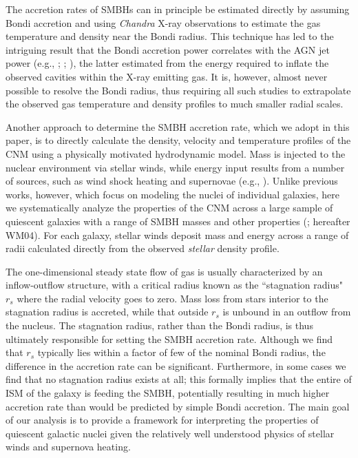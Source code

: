\documentclass[usenatbib,fleqn]{mn2e}
\newcommand{\rs}{r_s}
\begin{document}
The accretion rates of SMBHs can in principle be estimated directly by assuming Bondi accretion and using {\it Chandra} X-ray observations to estimate the gas temperature and density near the Bondi radius.  This technique has led to the intriguing result that the Bondi accretion power correlates with the AGN jet power (e.g., \citealt{AllenDunn+:2006a}; \citealt{Russell+13}; \citealt{FujitaKawakatu+:2014a}), the latter estimated from the energy required to inflate the observed cavities within the X-ray emitting gas.  It is, however, almost never possible to resolve the Bondi radius, thus requiring all such studies to extrapolate the observed gas temperature and density profiles to much smaller radial scales.  

Another approach to determine the SMBH accretion rate, which we adopt in this paper, is to directly calculate the density, velocity and temperature profiles of the CNM using a physically motivated hydrodynamic model.  Mass is injected to the nuclear environment via stellar winds, while energy input results from a number of sources, such as wind shock heating and supernovae (e.g., \citealt{Quataert:2004a,De-ColleGuillochon+:2012a,ShcherbakovWong+:2014a}).  Unlike previous works, however, which focus on modeling the nuclei of individual galaxies, here we systematically analyze the properties of the CNM across a large sample of quiescent galaxies with a range of SMBH masses and other properties (\citealt{WangMerritt:2004a}; hereafter WM04).  For each galaxy, stellar winds deposit mass and energy across a range of radii calculated directly from the observed {\it stellar} density profile.

The one-dimensional steady state flow of gas is usually characterized by an inflow-outflow structure, with a critical radius known as the ``stagnation radius" $\rs$ where the radial velocity goes to zero.  Mass loss from stars interior to the stagnation radius is accreted, while that outside $\rs$ is unbound in an outflow from the nucleus.  The stagnation radius, rather than the Bondi radius, is thus ultimately responsible for setting the SMBH accretion rate.  Although we find that $\rs$ typically lies within a factor of few of the nominal Bondi radius, the difference in the accretion rate can be significant.  Furthermore, in some cases we find that no stagnation radius exists at all; this formally implies that the entire of ISM of the galaxy is feeding the SMBH, potentially resulting in much higher accretion rate than would be predicted by simple Bondi accretion.  The main goal of our analysis is to provide a framework for interpreting the properties of quiescent galactic nuclei given the relatively well understood physics of stellar winds and supernova heating.   
\end{document}
